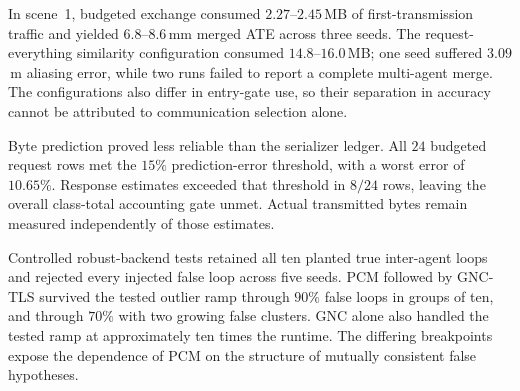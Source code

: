 \documentclass[10pt,a4paper]{article}
\begin{document}
In scene~1, budgeted exchange consumed $2.27$--$2.45$\,MB of
first-transmission traffic and yielded $6.8$--$8.6$\,mm merged ATE across
three seeds. The request-everything similarity configuration consumed
$14.8$--$16.0$\,MB; one seed suffered $3.09$\,m aliasing error, while two
runs failed to report a complete multi-agent merge. The configurations
also differ in entry-gate use, so their separation in accuracy cannot be
attributed to communication selection alone.

Byte prediction proved less reliable than the serializer ledger.
All $24$ budgeted request rows met the $15\%$ prediction-error threshold,
with a worst error of $10.65\%$. Response estimates exceeded that threshold
in $8/24$ rows, leaving the overall class-total accounting gate unmet.
Actual transmitted bytes remain measured independently of those estimates.

Controlled robust-backend tests retained all ten planted true inter-agent
loops and rejected every injected false loop across five seeds. PCM followed
by GNC-TLS survived the tested outlier ramp through $90\%$ false loops
in groups of ten, and through $70\%$ with two growing false clusters.
GNC alone also handled the tested ramp at approximately ten times the
runtime. The differing breakpoints expose the dependence of PCM on the
structure of mutually consistent false hypotheses.
\end{document}
